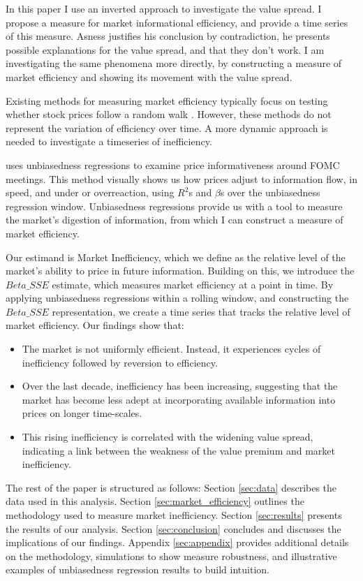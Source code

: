 In this paper I use an inverted approach to investigate the value spread. I propose a measure for market informational efficiency, and provide a time series
of this measure. Asness justifies his conclusion by contradiction, he presents possible explanations for the value spread, and that they don't work. I am investigating
the same phenomena more directly, by constructing a measure of market efficiency and showing its movement with the value spread.

Existing methods for measuring market efficiency typically focus on testing whether stock prices follow a random walk
\citep{fama_random_walk} \citep{lim_brooks_2010}. However, these methods do not represent the variation of efficiency over time.
A more dynamic approach is needed to investigate a timeseries of inefficiency.

\citet{boguth_2023} uses unbiasedness regressions to examine price informativeness around FOMC meetings. 
This method visually shows us how prices adjust to information flow, in speed, and under or overreaction, using $R^2$s and $\beta$s over the unbiasedness regression window.
Unbiasedness regressions provide us with a tool to measure the market's digestion of information, from which I can construct a measure of market efficiency.

Our estimand is Market Inefficiency, which we define as the relative level of the market's ability to price in future information.
Building on this, we introduce the \textit{$Beta\_SSE$} estimate, which measures market efficiency at a point in time. 
By applying unbiasedness regressions within a rolling window, and constructing the \textit{$Beta\_SSE$} representation, we create a time series that tracks the relative level of market 
efficiency. \newline
\newline
Our findings show that:
\begin{itemize}
    \item The market is not uniformly efficient. Instead, it experiences cycles of inefficiency followed by reversion to efficiency.
    \item Over the last decade, inefficiency has been increasing, suggesting that the market has become less adept at incorporating available information into prices on longer time-scales.
    \item This rising inefficiency is correlated with the widening value spread, indicating a link between the weakness of the value premium and market inefficiency.
\end{itemize}

The rest of the paper is structured as follows: Section \ref{sec:data} describes the data used in this analysis. Section \ref{sec:market_efficiency} outlines the methodology used to measure market inefficiency.
Section \ref{sec:results} presents the results of our analysis. Section \ref{sec:conclusion} concludes and discusses the implications of our findings. 
Appendix \ref{sec:appendix} provides additional details on the methodology, simulations to show measure robustness, and illustrative examples of unbiasedness regression results
to build intuition.